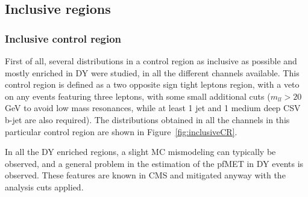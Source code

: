 \documentclass[a4paper, 10pt, openright]{report}
\begin{document}
\subsection{Inclusive regions}

\subsubsection{Inclusive control region} \label{section:inclusiveCR}

First of all, several distributions in a control region as inclusive as possible and mostly enriched in \ac{DY} were studied, in all the different channels available. This control region is defined as a two opposite sign tight leptons region, with a veto on any events featuring three leptons, with some small additional cuts ($m_{ll} > 20$ GeV to avoid low mass resonances, while at least 1 jet and 1 medium deep CSV b-jet are also required). The distributions obtained in all the channels in this particular control region are shown in Figure~\ref{fig:inclusiveCR}. 

In all the \ac{DY} enriched regions, a slight \ac{MC} mismodeling can typically be observed, and a general problem in the estimation of the pf\ac{MET} in \ac{DY} events is observed. These features are known in \ac{CMS} and mitigated anyway with the analysis cuts applied.
\end{document}
